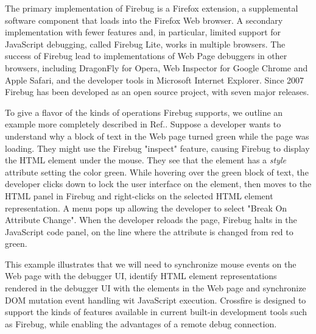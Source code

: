 The primary implementation of Firebug is a Firefox extension, a supplemental
software component that loads into the Firefox Web browser. A secondary
implementation with fewer features and, in particular, limited support for
JavaScript debugging, called Firebug Lite, works in multiple browsers. The
success of Firebug lead to implementations of Web Page debuggers in other
browsers, including DragonFly for Opera\cite{opera-dragonfly}, Web Inspector for
Google Chrome and Apple Safari\cite{WebInspector}, and the developer tools in
Microsoft Internet Explorer\cite{IETools}. Since 2007 Firebug has been developed
as an open source project, with seven major releases.

To give a flavor of the kinds of operations Firebug supports, we outline  an
example more completely described in Ref.\cite{jjb-www2010}. Suppose a developer
wants to understand why a block of text in the Web page turned green while the
page was loading. They might use the Firebug "inspect" feature, causing Firebug
to display the HTML element under the mouse. They see that the element has a
\textit{style} attribute setting the color green. While hovering over the green
block of text, the developer clicks down to lock the user interface on the
element, then moves to the HTML panel in Firebug and right-clicks on the
selected HTML element representation. A menu pops up allowing the developer to
select "Break On Attribute Change". When the developer reloads the page, Firebug
halts in the JavaScript code panel, on the line where the attribute is changed
from red to green.

This example illustrates that we will need to synchronize mouse events on the
Web page with the debugger UI, identify HTML element representations rendered in
the debugger UI with the elements in the Web page and synchronize DOM mutation
event handling wit JavaScript execution.
Crossfire is designed to support the kinds of features available in current built-in
development tools such as Firebug, while enabling the advantages of a remote
debug connection.


